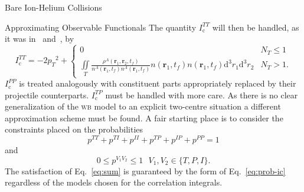 \documentclass[a5paper, 9 pt]{extreport}
\begin{document}
\begin{chapter}{Bare Ion-Helium Collisions \label{chap:p-he2p-he}}
\begin{section}{Approximating Observable Functionals \label{sec:phe2p-obs}}
      The quantity $I_\mathrm{c}^{TT}$ will then be handled, as it was in~\cite{thesis}
      and~\cite{pbarhe}, by
      \begin{equation} \label{eq:wbExplicit}
         I_\mathrm{c}^{TT} = - 2 {p_T}^2 +
         \begin{cases}
            0 & N_T \leq 1 \\
            \iint\limits_T \frac{\rho^A(\mathbf{r}_1, \mathbf{r}_2,t_f)}
                    {n^{A}(\mathbf{r}_1,t_f) n^{A}(\mathbf{r}_1,t_f)}
                    n(\mathbf{r}_1,t_f) n(\mathbf{r}_1,t_f) \mathrm{d}^3 r_1 \mathrm{d}^3 r_2
            & N_T > 1.
         \end{cases}
      \end{equation}
      $I_\mathrm{c}^{PP}$ is treated analogously with constituent parts appropriately replaced by their
      projectile counterparts. $I_\mathrm{c}^{TP}$ must be handled with more care. As there is no clear
      generalization of the \textsc{wb} model to an explicit two-centre situation a different
      approximation scheme must be found. A fair starting place is to consider the constraints placed on
      the probabilities
      \begin{equation} \label{eq:sum}
         p^{TT} + p^{TI} + p^{II} + p^{TP} + p^{IP} + p^{PP} = 1
      \end{equation}
      and
      \begin{equation} \label{eq:bound}
         0 \leq p^{V_1 V_2} \leq 1 ~ ~ ~ V_1, V_2 \in\{ T,P,I\}.
      \end{equation}
      The satisfaction of Eq.~\eqref{eq:sum} is guaranteed by the form of Eq.~\eqref{eq:prob-ic}
      regardless of the models chosen for the correlation integrals.


\end{section}
\end{chapter}
\end{document}
